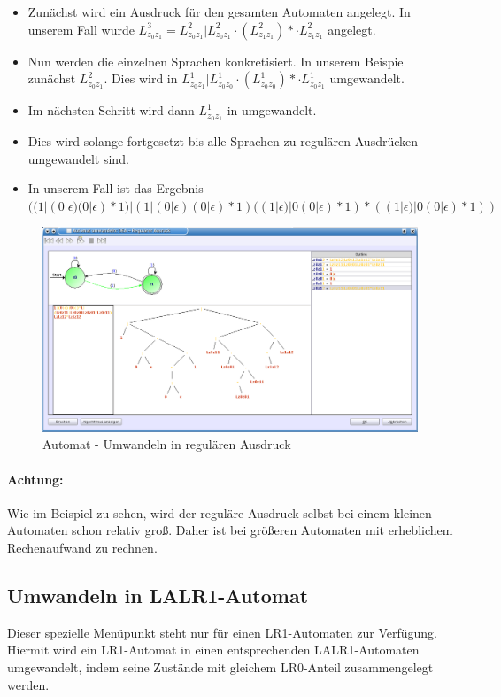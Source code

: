 \begin{itemize}

   \item Zunächst wird ein Ausdruck für den gesamten Automaten angelegt. In unserem Fall wurde $L_{z_0 z_1}^3 = L_{z_0 z_1}^2 | L_{z_0 z_1}^2 · (L_{z_1 z_1}^2)* · L_{z_1 z_1}^2$ angelegt.
   \item Nun werden die einzelnen Sprachen konkretisiert. In unserem Beispiel zunächst $L_{z_0 z_1}^2$. Dies wird in $L_{z_0 z_1}^1 | L_{z_0 z_0}^1 · (L_{z_0 z_0}^1)* · L_{z_0 z_1}^1$ umgewandelt.
   \item Im nächsten Schritt wird dann $L_{z_0 z_1}^1$ in  umgewandelt.
   \item Dies wird solange fortgesetzt bis alle Sprachen zu regulären Ausdrücken umgewandelt sind.
   \item In unserem Fall ist das Ergebnis $((1|(0|\epsilon)(0|\epsilon)*1)|(1|(0|\epsilon)(0|\epsilon)*1)((1|\epsilon)|0(0|\epsilon)*1)*((1|\epsilon)|0(0|\epsilon)*1))$

\end{itemize}

\begin{figure}[h!]
\begin{center}
\includegraphics[width=12cm]{../images/dfa_to_regex.png}
\caption{Automat - Umwandeln in regulären Ausdruck}
\end{center}
\end{figure}

\paragraph{Achtung:} Wie im Beispiel zu sehen, wird der reguläre Ausdruck selbst bei einem kleinen Automaten schon relativ groß. Daher ist bei größeren Automaten mit erheblichem Rechenaufwand zu rechnen.

\subsection{Umwandeln in LALR1-Automat}
Dieser spezielle Menüpunkt steht nur für einen LR1-Automaten zur Verfügung.
Hiermit wird ein LR1-Automat in einen entsprechenden LALR1-Automaten umgewandelt,
indem seine Zustände mit gleichem LR0-Anteil zusammengelegt werden.

